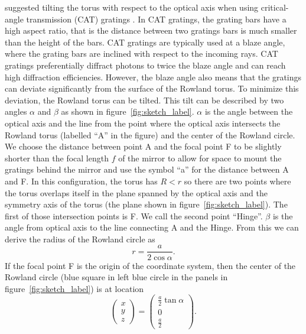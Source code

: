 \documentclass[linenumbers]{aastex631}
\begin{document}
\citet{doi:10.1117/12.856482} suggested tilting the torus with respect to the optical axis when using critical-angle transmission (CAT) gratings \citep{2021hai4.book..235H,2022ApJ...934..171H}. In CAT gratings, the grating bars have a high aspect ratio, that is the distance between two gratings bars is much smaller than the height of the bars. CAT gratings are typically used at a blaze angle, where the grating bars are inclined with respect to the incoming rays. CAT gratings preferentially diffract photons to twice the blaze angle and can reach high diffraction efficiencies. However, the blaze angle also means that the gratings can deviate significantly from the surface of the  Rowland torus. To minimize this deviation, the Rowland torus can be tilted.
This tilt can be described by two angles $\alpha$ and $\beta$ as shown in figure~\ref{fig:sketch_label}. $\alpha$ is the angle between the optical axis and the line from the point where the optical axis intersects the Rowland torus (labelled ``A'' in the figure) and the center of the Rowland circle.  We choose the distance between point A and the focal point F to be slightly shorter than the focal length $f$ of the mirror to allow for space to mount the gratings behind the mirror and use the symbol ``a'' for the distance between A and F.
In this configuration, the torus has $R < r$ so there are two points where the torus overlaps itself in the plane spanned by the optical axis and the symmetry axis of the torus (the plane shown in figure~\ref{fig:sketch_label}). The first of those intersection points is F. We call the second point ``Hinge''.
$\beta$ is the angle from optical axis to the line connecting A and the Hinge. From this we can derive the radius of the Rowland circle as
$$r = \frac{a}{2\cos \alpha}.$$
 If the focal point F is the origin of the coordinate system, then the center of the Rowland circle (blue square in left blue circle in the panels in figure~\ref{fig:sketch_label}) is at location
 \begin{equation}
    \begin{pmatrix} x \\ y \\ z \end{pmatrix} =
    \begin{pmatrix} \frac{a}{2} \tan\alpha \\0 \\   \frac{a}{2} \end{pmatrix}.
 \end{equation}
\end{document}
